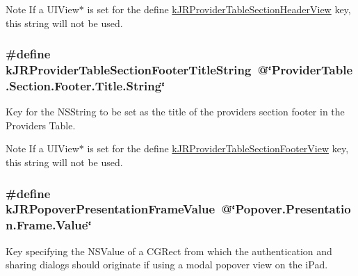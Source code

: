 \begin{DoxyNote}{Note}
If a {\ttfamily UIView$\ast$} is set for the define \hyperlink{group__custom_interface_gaaff8ebdd2b9badb1d0a019a71d47db46}{kJRProviderTableSectionHeaderView} key, this string will not be used. 
\end{DoxyNote}
\hypertarget{group__custom_interface_ga72e63105251e7d4d6a363e279c2bf775}{
\subsubsection[{kJRProviderTableSectionFooterTitleString}]{\setlength{\rightskip}{0pt plus 5cm}\#define kJRProviderTableSectionFooterTitleString~@\char`\"{}ProviderTable.Section.Footer.Title.String\char`\"{}}}
\label{group__custom_interface_ga72e63105251e7d4d6a363e279c2bf775}
Key for the {\ttfamily NSString} to be set as the title of the providers section footer in the Providers Table.

\begin{DoxyNote}{Note}
If a {\ttfamily UIView$\ast$} is set for the define \hyperlink{group__custom_interface_ga984c096e9258dea402a1c27ae8bb6c8f}{kJRProviderTableSectionFooterView} key, this string will not be used. 
\end{DoxyNote}
\hypertarget{group__custom_interface_ga487550fb53295a3b536f6d233d221aca}{
\subsubsection[{kJRPopoverPresentationFrameValue}]{\setlength{\rightskip}{0pt plus 5cm}\#define kJRPopoverPresentationFrameValue~@\char`\"{}Popover.Presentation.Frame.Value\char`\"{}}}
\label{group__custom_interface_ga487550fb53295a3b536f6d233d221aca}
Key specifying the {\ttfamily NSValue} of a {\ttfamily CGRect} from which the authentication and sharing dialogs should originate if using a modal popover view on the iPad.

